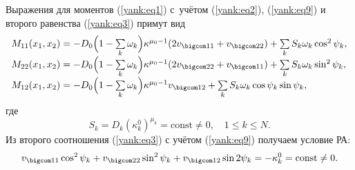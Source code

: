 Выражения для моментов (\ref{yank:eq1}) с~учётом (\ref{yank:eq2}), (\ref{yank:eq9}) и второго равенства (\ref{yank:eq3}) примут вид
\begin{equation}\label{yank:eq10}
\begin{array}{l}
M_{11}(x_1 , x_2 )=-D_0 \Bigl(1-\sum\limits_k \omega_k \Bigr)\kappa^{\mu_0 -1}(2v_{\bigcom 11}+v_{\bigcom 22})+\sum\limits_k S_k \omega_k \cos^2 \psi_k ,\\
M_{22}(x_1 , x_2 )=-D_0 \Bigl(1-\sum\limits_k \omega_k \Bigr)\kappa^{\mu_0 -1}(2v_{\bigcom 22}+v_{\bigcom 11})+\sum\limits_k S_k \omega_k \sin^2 \psi_k ,\\
M_{12}(x_1 , x_2 )=-D_0 \Bigl(1-\sum\limits_k \omega_k \Bigr)\kappa^{\mu_0 -1}v_{\bigcom 12}+\sum\limits_k S_k \omega_k \cos\psi_k \sin\psi_k ,\\
\end{array}
\end{equation}
где
\begin{equation} \label{yank:eq11}
S_k =D_k(\kappa_k ^0 )^{\mu_k }=\text{const}\neq0, \quad 1\leq k\leq N.
\end{equation}
Из второго соотношения (\ref{yank:eq3}) с учётом (\ref{yank:eq9}) получаем условие РА:
\begin{equation} \label{yank:eq12}
v_{\bigcom 11}\cos^2 \psi_k +v_{\bigcom 22}\sin^2 \psi_k +v_{\bigcom 12}\sin2\psi_k =-\kappa_k ^0 =\text{const}\neq0.
\end{equation}

